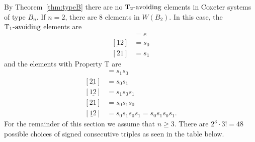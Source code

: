By Theorem~\ref{thm:typeB} there are no $\operatorname{T_2-\mathrm{avoiding}}$ elements in  Coxeter systems of type $B_n$. If $n=2$, there are 8 elements in $W(B_2)$. In this case, the $\operatorname{T_1-\mathrm{avoiding}}$ elements are
\begin{align*}
[12] &= e\\
[\underbar{1}2]&= s_0\\
[21] &= s_1	
\end{align*}
and the elements with Property T are
\begin{align*}
[\underbar{2}1] &= s_1s_0\\
[2\underbar{1}]	&= s_0s_1\\
[1\underbar{2}] &= s_1s_0s_1\\
[\underbar{21}] &= s_0s_1s_0\\
[\underbar{12}] &= s_0s_1s_0s_1 =s_0s_1s_0s_1.
\end{align*}
For the remainder of this section we assume that $n \geq 3$. There are $2^3 \cdot 3!=48$ possible choices of signed consecutive triples as seen in the table below. 

